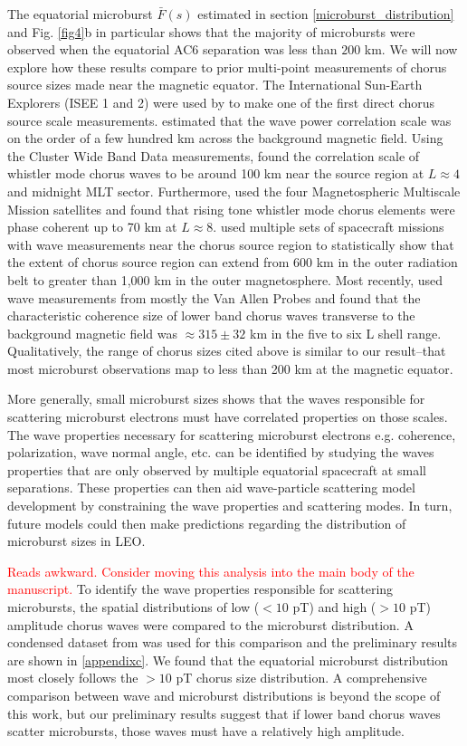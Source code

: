 \documentclass[draft]{agujournal2019}
\begin{document}
The equatorial microburst $\bar{F}(s)$ estimated in section \ref{microburst_distribution} and Fig. \ref{fig4}b in particular shows that the majority of microbursts were observed when the equatorial AC6 separation was less than $200$ km. We will now explore how these results compare to prior multi-point measurements of chorus source sizes made near the magnetic equator. The International Sun-Earth Explorers (ISEE 1 and 2) were used by  to make one of the first direct chorus source scale measurements.  estimated that the wave power correlation scale was on the order of a few hundred km across the background magnetic field. Using the Cluster Wide Band Data measurements,  found the correlation scale of whistler mode chorus waves to be around 100 km near the source region at $L \approx 4$ and midnight MLT sector. Furthermore,  used the four Magnetospheric Multiscale Mission satellites and found that rising tone whistler mode chorus elements were phase coherent up to 70 km at $L \approx 8$.  used multiple sets of spacecraft missions with wave measurements near the chorus source region to statistically show that the extent of chorus source region can extend from 600 km in the outer radiation belt to greater than 1,000 km in the outer magnetosphere. Most recently,  used wave measurements from mostly the Van Allen Probes and found that the characteristic coherence size of lower band chorus waves transverse to the background magnetic field was $\approx 315 \pm 32$ km in the five to six L shell range. Qualitatively, the range of chorus sizes cited above is similar to our result--that most microburst observations map to less than 200 km at the magnetic equator.

More generally, small microburst sizes shows that the waves responsible for scattering microburst electrons must have correlated properties on those scales. The wave properties necessary for scattering microburst electrons e.g. coherence, polarization, wave normal angle, etc. can be identified by studying the waves properties that are only observed by multiple equatorial spacecraft at small separations. These properties can then aid wave-particle scattering model development by constraining the wave properties and scattering modes. In turn, future models could then make predictions regarding the distribution of microburst sizes in LEO. 

\textcolor{red}{Reads awkward. Consider moving this analysis into the main body of the manuscript.}
To identify the wave properties responsible for scattering microbursts, the spatial distributions of low ($< 10$ pT) and high ($> 10$ pT) amplitude chorus waves were compared to the microburst distribution. A condensed dataset from  was used for this comparison and the preliminary results are shown in \ref{appendixc}. We found that the equatorial microburst distribution most closely follows the $> 10$ pT chorus size distribution. A comprehensive comparison between wave and microburst distributions is beyond the scope of this work, but our preliminary results suggest that if lower band chorus waves scatter microbursts, those waves must have a relatively high amplitude.
\end{document}
